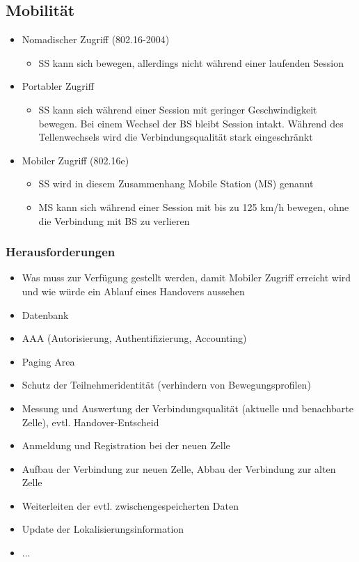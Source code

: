 \subsection{Mobilität}
\begin{itemize}
\item Nomadischer Zugriff (802.16-2004)
\begin{itemize}
\item SS kann sich bewegen, allerdings nicht während einer laufenden Session
\end{itemize}
\item Portabler Zugriff
\begin{itemize}
\item SS kann sich während einer Session mit geringer Geschwindigkeit bewegen. Bei einem Wechsel der BS bleibt Session intakt. Während des Tellenwechsels wird die Verbindungsqualität stark eingeschränkt
\end{itemize}
\item Mobiler Zugriff (802.16e)
\begin{itemize}
\item SS wird in diesem Zusammenhang Mobile Station (MS) genannt
\item MS kann sich während einer Session mit bis zu 125 km/h bewegen, ohne die Verbindung mit BS zu verlieren
\end{itemize}
\end{itemize}

\subsubsection{Herausforderungen}
\begin{itemize}
\item Was muss zur Verfügung gestellt werden, damit Mobiler Zugriff erreicht wird und wie würde ein Ablauf eines Handovers aussehen
\item Datenbank
\item AAA (Autorisierung, Authentifizierung, Accounting)
\item Paging Area
\item Schutz der Teilnehmeridentität (verhindern von Bewegungsprofilen)
\item Messung und Auswertung der Verbindungsqualität (aktuelle und benachbarte Zelle), evtl. Handover-Entscheid
\item Anmeldung und Registration bei der neuen Zelle
\item Aufbau der Verbindung zur neuen Zelle, Abbau der Verbindung zur alten Zelle
\item Weiterleiten der evtl. zwischengespeicherten Daten
\item Update der Lokalisierungsinformation
\item ...
\end{itemize}

